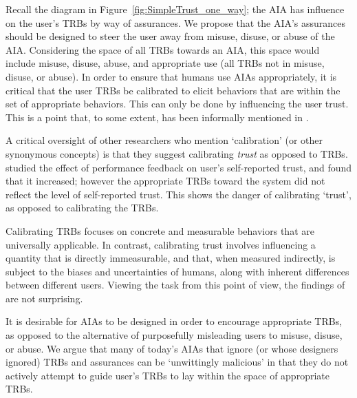     Recall the diagram in Figure~\ref{fig:SimpleTrust_one_way}; the AIA has influence on the user's TRBs by way of assurances. We propose that the AIA's assurances should be designed to steer the user away from misuse, disuse, or abuse of the AIA. Considering the space of all TRBs towards an AIA, this space would include misuse, disuse, abuse, and appropriate use (all TRBs not in misuse, disuse, or abuse). In order to ensure that humans use AIAs appropriately, it is critical that the user TRBs be calibrated to elicit behaviors that are within the set of appropriate behaviors. This can only be done by influencing the user trust. This is a point that, to some extent, has been informally mentioned in \citet{Muir1994-ow,Muir1987-mk,Lillard2016-yg,Lee2004-pv,Hutchins2015-if}.

    A critical oversight of other researchers who mention `calibration' (or other synonymous concepts) is that they suggest calibrating \emph{trust} as opposed to TRBs. \citet{Dzindolet2003-ts} studied the effect of performance feedback on user's self-reported trust, and found that it increased; however the appropriate TRBs toward the system did not reflect the level of self-reported trust. This shows the danger of calibrating `trust', as opposed to calibrating the TRBs.

    Calibrating TRBs focuses on concrete and measurable behaviors that are universally applicable. In contrast, calibrating trust involves influencing a quantity that is directly immeasurable, and that, when measured indirectly, is subject to the biases and uncertainties of humans, along with inherent differences between different users. Viewing the task from this point of view, the findings of \citeauthor{Dzindolet2003-ts} are not surprising.

    It is desirable for AIAs to be designed in order to encourage appropriate TRBs, as opposed to the alternative of purposefully misleading users to misuse, disuse, or abuse. We argue that many of today's AIAs that ignore (or whose designers ignored) TRBs and assurances can be `unwittingly malicious' in that they do not actively attempt to guide user's TRBs to lay within the space of appropriate TRBs.

